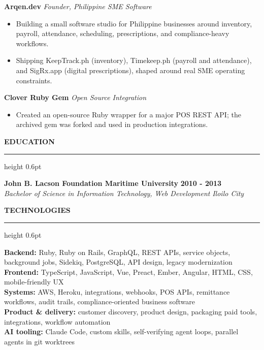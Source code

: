 \documentclass[10pt,letterpaper]{article}
\newcommand{\sectionheading}[1]{%
  \vspace{8pt}
  {\large\bfseries\MakeUppercase{#1}}\par
  \vspace{1pt}
  \hrule height 0.6pt
  \vspace{4pt}
}
\newcommand{\projectentry}[2]{%
  \Needspace{3\baselineskip}%
  \textbf{#1} \hfill \textit{#2}\\[-2pt]
}
\begin{document}
\projectentry{Arqen.dev}{Founder, Philippine SME Software}
\begin{itemize}
  \item Building a small software studio for Philippine businesses around inventory, payroll, attendance, scheduling, prescriptions, and compliance-heavy workflows.
  \item Shipping KeepTrack.ph (inventory), Timekeep.ph (payroll and attendance), and SigRx.app (digital prescriptions), shaped around real SME operating constraints.
\end{itemize}

\projectentry{Clover Ruby Gem}{Open Source Integration}
\begin{itemize}
  \item Created an open-source Ruby wrapper for a major POS REST API; the archived gem was forked and used in production integrations.
\end{itemize}

\sectionheading{Education}
\textbf{John B. Lacson Foundation Maritime University} \hfill \textbf{2010 - 2013}\\
\textit{Bachelor of Science in Information Technology, Web Development} \hfill \textit{Iloilo City}

\sectionheading{Technologies}
\textbf{Backend:} Ruby, Ruby on Rails, GraphQL, REST APIs, service objects, background jobs, Sidekiq, PostgreSQL, API design, legacy modernization\\
\textbf{Frontend:} TypeScript, JavaScript, Vue, Preact, Ember, Angular, HTML, CSS, mobile-friendly UX\\
\textbf{Systems:} AWS, Heroku, integrations, webhooks, POS APIs, remittance workflows, audit trails, compliance-oriented business software\\
\textbf{Product \& delivery:} customer discovery, product design, packaging paid tools, integrations, workflow automation\\
\textbf{AI tooling:} Claude Code, custom skills, self-verifying agent loops, parallel agents in git worktrees
\end{document}
